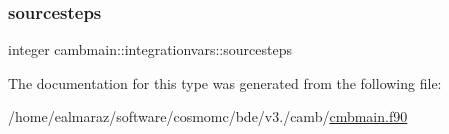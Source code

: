 \mbox{\label{structcambmain_1_1integrationvars_a06fdc06801d7c47d381d6ac39998d2f4}} 
\subsubsection{\texorpdfstring{sourcesteps}{sourcesteps}}
{\footnotesize\ttfamily integer cambmain\+::integrationvars\+::sourcesteps\hspace{0.3cm}{\ttfamily [private]}}



The documentation for this type was generated from the following file\+:\begin{DoxyCompactItemize}
\item 
/home/ealmaraz/software/cosmomc/bde/v3./camb/\mbox{\hyperlink{cmbmain_8f90}{cmbmain.\+f90}}\end{DoxyCompactItemize}
